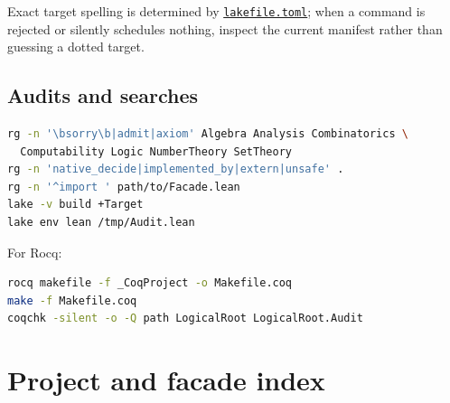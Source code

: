 \documentclass[
  10pt,
  a4paper,
  twoside,
  open=any,
  parskip=half,
  headings=big
]{scrreprt}
\newcommand{\CommitFull}{56a402bf82a9aab119fcbe3e96b991d387b221c5}
\newcommand{\RepoWeb}{https://github.com/VladimirReshetnikov/ProveIt}
\newcommand{\RepoBlobBase}{\RepoWeb/blob/\CommitFull}
\newcommand{\RepoFile}[1]{\href{\RepoBlobBase/#1}{\nolinkurl{#1}}}
\begin{document}
Exact target spelling is determined by \RepoFile{lakefile.toml}; when a command is rejected or silently schedules nothing, inspect the current manifest rather than guessing a dotted target.

\section{Audits and searches}

\begin{lstlisting}[language=bash]
rg -n '\bsorry\b|admit|axiom' Algebra Analysis Combinatorics \
  Computability Logic NumberTheory SetTheory
rg -n 'native_decide|implemented_by|extern|unsafe' .
rg -n '^import ' path/to/Facade.lean
lake -v build +Target
lake env lean /tmp/Audit.lean
\end{lstlisting}

For Rocq:

\begin{lstlisting}[language=bash]
rocq makefile -f _CoqProject -o Makefile.coq
make -f Makefile.coq
coqchk -silent -o -Q path LogicalRoot LogicalRoot.Audit
\end{lstlisting}

\chapter{Project and facade index}
\label{app:index}
\end{document}
